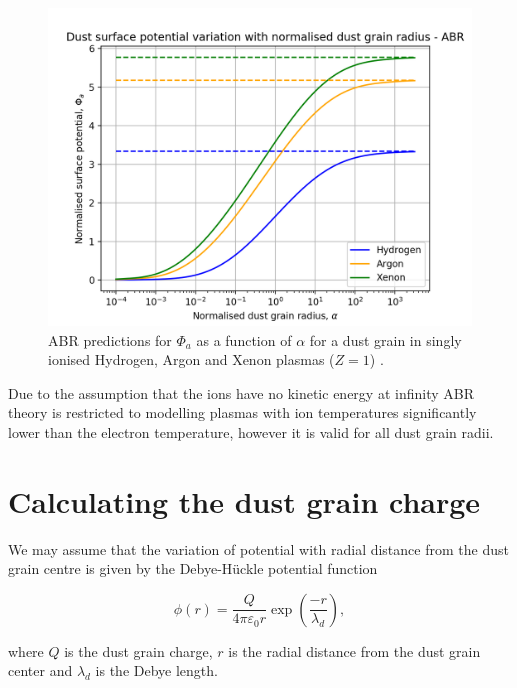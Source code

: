 \documentclass[journal]{Imperial_lab_report}
\begin{document}
\begin{figure}[H]
\centering
\includegraphics[width=\linewidth]{Output/ABRgraph.jpeg}
\caption{ABR predictions for $\Phi_a$ as a function of $\alpha$ for a dust grain in singly ionised Hydrogen, Argon and Xenon plasmas ($Z=1$) \cite{ABR} \cite{Thomas}.}
\label{ABR} 
\end{figure}

Due to the assumption that the ions have no kinetic energy at infinity ABR theory is restricted to modelling plasmas with ion temperatures significantly lower than the electron temperature, however it is valid for all dust grain radii.

\medskip

\section{Calculating the dust grain charge}

\medskip

We may assume that the variation of potential with radial distance from the dust grain centre is given by the Debye-Hückle potential function 

\begin{equation}\label{eq:DH}
\phi(r) = \frac{Q}{4 \pi \varepsilon_0 r} \exp{\left(\frac{-r}{\lambda_d}\right)},
\end{equation}

\noindent where $Q$ is the dust grain charge, $r$ is the radial distance from the dust grain center and $\lambda_d$ is the Debye length.

\smallskip
\end{document}
